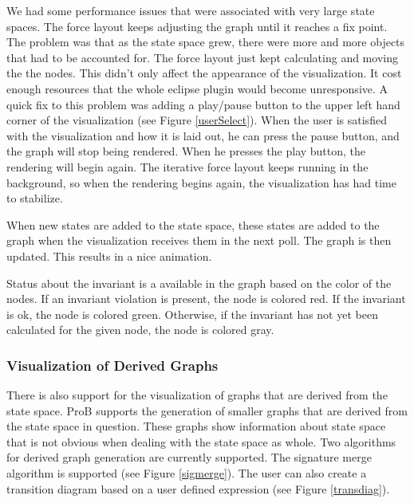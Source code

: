 We had some performance issues that were associated with very large state spaces. The force layout keeps adjusting the graph until it reaches a fix point. The problem was that as the state space grew, there were more and more objects that had to be accounted for. The force layout just kept calculating and moving the the nodes. This didn't only affect the appearance of the visualization. It cost enough resources that the whole eclipse plugin would become unresponsive. A quick fix to this problem was adding a play/pause button to the upper left hand corner of the visualization (see Figure \ref{userSelect}). When the user is satisfied with the visualization and how it is laid out, he can press the pause button, and the graph will stop being rendered. When he presses the play button, the rendering will begin again. The iterative force layout keeps running in the background, so when the rendering begins again, the visualization has had time to stabilize.

When new states are added to the state space, these states are added to the graph when the visualization receives them in the next poll. The graph is then updated. This results in a nice animation.

Status about the invariant is a available in the graph based on the color of the nodes. If an invariant violation is present, the node is colored red. If the invariant is ok, the node is colored green. Otherwise, if the invariant has not yet been calculated for the given node, the node is colored gray.

\subsubsection{Visualization of Derived Graphs}

There is also support for the visualization of graphs that are derived from the state space. ProB supports the generation of smaller graphs that are derived from the state space in question. These graphs show information about state space that is not obvious when dealing with the state space as whole. Two algorithms for derived graph generation are currently supported. The signature merge algorithm is supported (see Figure \ref{sigmerge}). The user can also create a transition diagram based on a user defined expression (see Figure \ref{transdiag}). 

